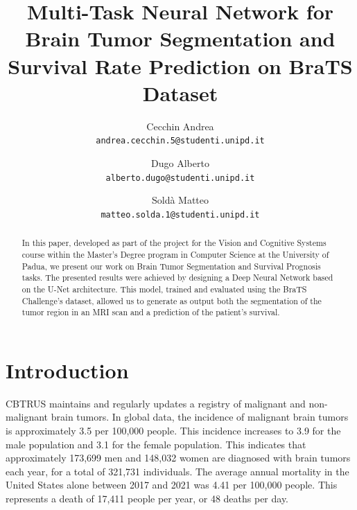 \documentclass[10pt,twocolumn,letterpaper]{article}
\begin{document}
\title{Multi-Task Neural Network for Brain Tumor Segmentation and Survival Rate Prediction on BraTS Dataset}
\author{Cecchin Andrea\\
{\tt\scriptsize andrea.cecchin.5@studenti.unipd.it}\\
\and
Dugo Alberto\\
{\tt\scriptsize alberto.dugo@studenti.unipd.it}\\
\and
Soldà Matteo\\
{\tt\scriptsize matteo.solda.1@studenti.unipd.it}\\
}
\maketitle

\begin{abstract}
In this paper, developed as part of the project for the Vision and Cognitive Systems course within the Master's Degree program in Computer Science at the University of Padua, we present our work on Brain Tumor Segmentation and Survival Prognosis tasks. The presented results were achieved by designing a Deep Neural Network based on the U-Net architecture. This model, trained and evaluated using the BraTS Challenge's dataset, allowed us to generate as output both the segmentation of the tumor region in an MRI scan and a prediction of the patient's survival.
\end{abstract}

\section{Introduction}
CBTRUS\cite{CBTRUSTumors2022} maintains and regularly updates a registry of malignant and non-malignant brain tumors.
In global data, the incidence of malignant brain tumors is approximately 3.5 per 100,000 people. This incidence increases to 3.9 for the male population and 3.1 for the female population. This indicates that approximately 173,699 men and 148,032 women are diagnosed with brain tumors each year, for a total of 321,731 individuals. The average annual mortality in the United States alone between 2017 and 2021 was 4.41 per 100,000 people. This represents a death of 17,411 people per year, or 48 deaths per day.
\end{document}
